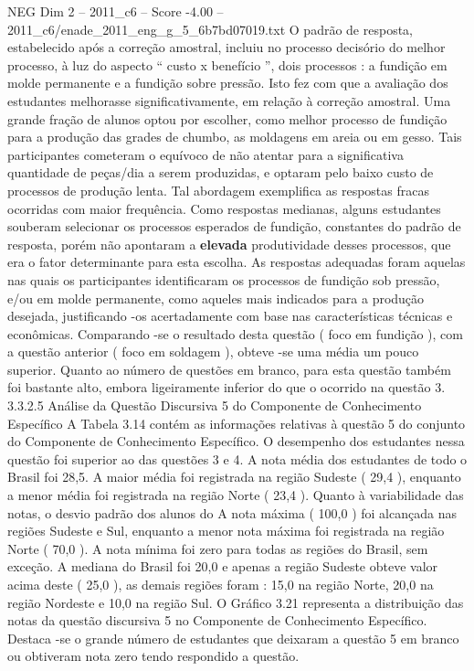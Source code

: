 \begin{textsample}{NEG Dim 2 – 2011\_c6 – Score -4.00 – 2011\_c6/enade\_2011\_eng\_g\_5\_6b7bd07019.txt}
O padrão de resposta, estabelecido após a correção amostral, incluiu no processo decisório do melhor processo, à luz do aspecto “ custo x benefício ”, dois processos : a fundição em molde permanente e a fundição sobre pressão.
Isto fez com que a avaliação dos estudantes melhorasse significativamente, em relação à correção amostral.
Uma grande fração de alunos optou por escolher, como melhor processo de fundição para a produção das grades de chumbo, as moldagens em areia ou em gesso.
Tais participantes cometeram o equívoco de não atentar para a significativa quantidade de peças/dia a serem produzidas, e optaram pelo baixo custo de processos de produção lenta.
Tal abordagem exemplifica as respostas fracas ocorridas com maior frequência.
Como respostas medianas, alguns estudantes souberam selecionar os processos esperados de fundição, constantes do padrão de resposta, porém não apontaram a \textbf{elevada} produtividade desses processos, que era o fator determinante para esta escolha.
As respostas adequadas foram aquelas nas quais os participantes identificaram os processos de fundição sob pressão, e/ou em molde permanente, como aqueles mais indicados para a produção desejada, justificando -os acertadamente com base nas características técnicas e econômicas.
Comparando -se o resultado desta questão ( foco em fundição ), com a questão anterior ( foco em soldagem ), obteve -se uma média um pouco superior.
Quanto ao número de questões em branco, para esta questão também foi bastante alto, embora ligeiramente inferior do que o ocorrido na questão 3. 3.3.2.5 Análise da Questão Discursiva 5 do Componente de Conhecimento Específico A Tabela 3.14 contém as informações relativas à questão 5 do conjunto do Componente de Conhecimento Específico.
O desempenho dos estudantes nessa questão foi superior ao das questões 3 e 4.
A nota média dos estudantes de todo o Brasil foi 28,5.
A maior média foi registrada na região Sudeste ( 29,4 ), enquanto a menor média foi registrada na região Norte ( 23,4 ).
Quanto à variabilidade das notas, o desvio padrão dos alunos do A nota máxima ( 100,0 ) foi alcançada nas regiões Sudeste e Sul, enquanto a menor nota máxima foi registrada na região Norte ( 70,0 ).
A nota mínima foi zero para todas as regiões do Brasil, sem exceção.
A mediana do Brasil foi 20,0 e apenas a região Sudeste obteve valor acima deste ( 25,0 ), as demais regiões foram : 15,0 na região Norte, 20,0 na região Nordeste e 10,0 na região Sul.
O Gráfico 3.21 representa a distribuição das notas da questão discursiva 5 no Componente de Conhecimento Específico.
Destaca -se o grande número de estudantes que deixaram a questão 5 em branco ou obtiveram nota zero tendo respondido a questão.

\end{textsample}
